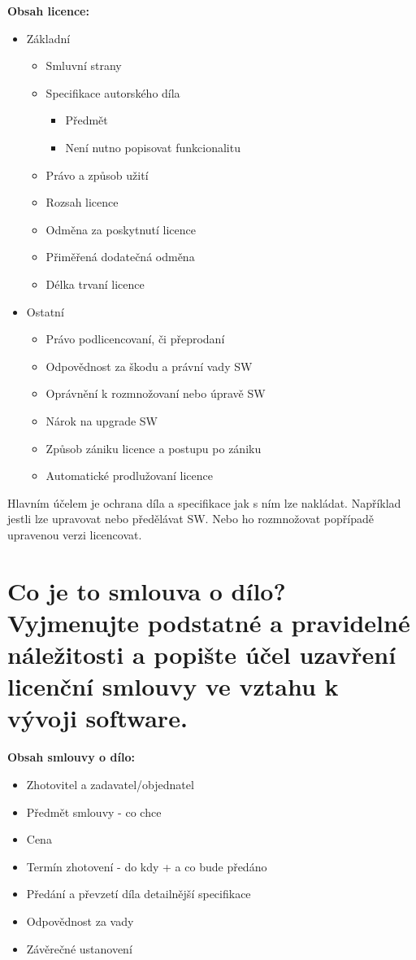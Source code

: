 \documentclass[12pt,a4paper,czech]{article}
\newcommand{\nadpis}[1]{{\section{#1}}}
\begin{document}
\noindent\textbf{Obsah licence:}
\begin{itemize}
    \item Základní
    \begin{itemize}
        \item Smluvní strany
        \item Specifikace autorského díla
        \begin{itemize}
            \item Předmět
            \item Není nutno popisovat funkcionalitu
        \end{itemize}
        \item Právo a způsob užití
        \item Rozsah licence
        \item Odměna za poskytnutí licence
        \item Přiměřená dodatečná odměna
        \item Délka trvaní licence
    \end{itemize}
    \item Ostatní
    \begin{itemize}
        \item Právo podlicencovaní, či přeprodaní
        \item Odpovědnost za škodu a právní vady SW
        \item Oprávnění k rozmnožovaní nebo úpravě SW
        \item Nárok na upgrade SW
        \item Způsob zániku licence a postupu po zániku
        \item Automatické prodlužovaní licence
    \end{itemize}
\end{itemize}
  
Hlavním účelem je ochrana díla a specifikace jak s ním lze nakládat. Například jestli lze upravovat nebo předělávat SW. Nebo ho rozmnožovat popřípadě upravenou verzi licencovat. 


\vspace{0.5cm} 
\nadpis{Co je to smlouva o dílo? Vyjmenujte podstatné a pravidelné náležitosti a popište účel uzavření licenční smlouvy ve vztahu k vývoji software.}

\noindent\textbf{Obsah smlouvy o dílo:}
\begin{itemize}
    \setlength\itemsep{0em}
    \item Zhotovitel a zadavatel/objednatel
    \item Předmět smlouvy - co chce
    \item Cena
    \item Termín zhotovení - do kdy + a co bude předáno
    \item Předání a převzetí díla detailnější specifikace
    \item Odpovědnost za vady
    \item Závěrečné ustanovení
\end{itemize}
\end{document}
